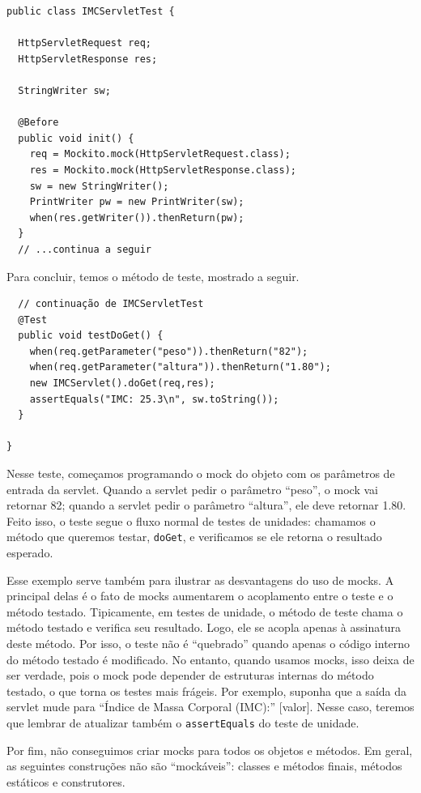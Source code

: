 \documentclass[
  11pt,
  twoside]{book}
\newcommand{\passthrough}[1]{#1}
\begin{document}
\begin{lstlisting}
public class IMCServletTest {

  HttpServletRequest req;
  HttpServletResponse res;

  StringWriter sw;

  @Before
  public void init() {
    req = Mockito.mock(HttpServletRequest.class);
    res = Mockito.mock(HttpServletResponse.class);
    sw = new StringWriter();
    PrintWriter pw = new PrintWriter(sw);
    when(res.getWriter()).thenReturn(pw);
  }
  // ...continua a seguir
\end{lstlisting}

Para concluir, temos o método de teste, mostrado a seguir.

\begin{lstlisting}
  // continuação de IMCServletTest
  @Test
  public void testDoGet() {
    when(req.getParameter("peso")).thenReturn("82");
    when(req.getParameter("altura")).thenReturn("1.80");
    new IMCServlet().doGet(req,res);
    assertEquals("IMC: 25.3\n", sw.toString());
  }

}
\end{lstlisting}

Nesse teste, começamos programando o mock do objeto com os parâmetros de
entrada da servlet. Quando a servlet pedir o parâmetro ``peso'', o mock
vai retornar 82; quando a servlet pedir o parâmetro ``altura'', ele deve
retornar 1.80. Feito isso, o teste segue o fluxo normal de testes de
unidades: chamamos o método que queremos testar,
\passthrough{\lstinline!doGet!}, e verificamos se ele retorna o
resultado esperado.

Esse exemplo serve também para ilustrar as desvantagens do uso de mocks.
A principal delas é o fato de mocks aumentarem o acoplamento entre o
teste e o método testado. Tipicamente, em testes de unidade, o método de
teste chama o método testado e verifica seu resultado. Logo, ele se
acopla apenas à assinatura deste método. Por isso, o teste não é
``quebrado'' quando apenas o código interno do método testado é
modificado. No entanto, quando usamos mocks, isso deixa de ser verdade,
pois o mock pode depender de estruturas internas do método testado, o
que torna os testes mais frágeis. Por exemplo, suponha que a saída da
servlet mude para ``Índice de Massa Corporal (IMC):'' {[}valor{]}. Nesse
caso, teremos que lembrar de atualizar também o
\passthrough{\lstinline!assertEquals!} do teste de unidade.

Por fim, não conseguimos criar mocks para todos os objetos e métodos. Em
geral, as seguintes construções não são ``mockáveis'': classes e métodos
finais, métodos estáticos e construtores.
\end{document}
